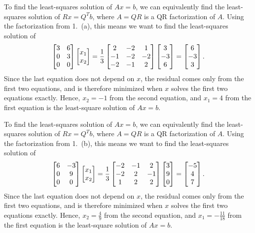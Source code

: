 \documentclass{homework}
\begin{document}
	\question
	\begin{alphaparts}
		\questionpart To find the least-squares solution of $Ax=b$, we can equivalently find the least-squares solution of $Rx = Q^Tb$, where $A = QR$ is a QR factorization of $A$. Using the factorization from 1.\ (a), this means we want to find the least-squares solution of
		\begin{equation*}
			\left[\begin{matrix}3 & 6 \\ 0 & 3 \\0 & 0\end{matrix}\right]\left[\begin{matrix}x_1 \\ x_2\end{matrix}\right] = \frac{1}{3}\left[\begin{matrix}2 & -2 & 1 \\ -1 & -2 & -2 \\ -2 & -1 & 2\end{matrix}\right]\left[\begin{matrix}3 \\ -3 \\ 6\end{matrix}\right] = \left[\begin{matrix}6 \\ -3 \\ 3\end{matrix}\right].
		\end{equation*}
		Since the last equation does not depend on $x$, the residual comes only from the first two equations, and is therefore minimized when $x$ solves the first two equations exactly. Hence, $x_2= -1$ from the second equation, and $x_1 = 4$ from the first equation is the least-square solution of $Ax = b$.
		
		\questionpart  To find the least-squares solution of $Ax=b$, we can equivalently find the least-squares solution of $Rx = Q^Tb$, where $A = QR$ is a QR factorization of $A$. Using the factorization from 1.\ (b), this means we want to find the least-squares solution of
		\begin{equation*}
			\left[\begin{matrix}6 & -3 \\ 0 & 9 \\0 & 0\end{matrix}\right]\left[\begin{matrix}x_1 \\ x_2\end{matrix}\right] = \frac{1}{3}\left[\begin{matrix}-2 & -1 & 2 \\ -2 & 2 & -1 \\ 1 & 2 & 2\end{matrix}\right]\left[\begin{matrix}3 \\ 9 \\ 0\end{matrix}\right] = \left[\begin{matrix}-5 \\ 4 \\ 7\end{matrix}\right].
		\end{equation*}
		Since the last equation does not depend on $x$, the residual comes only from the first two equations, and is therefore minimized when $x$ solves the first two equations exactly. Hence, $x_2= \frac{4}{9}$ from the second equation, and $x_1 = -\frac{11}{18}$ from the first equation is the least-square solution of $Ax = b$.
	\end{alphaparts}
	
\end{document}
